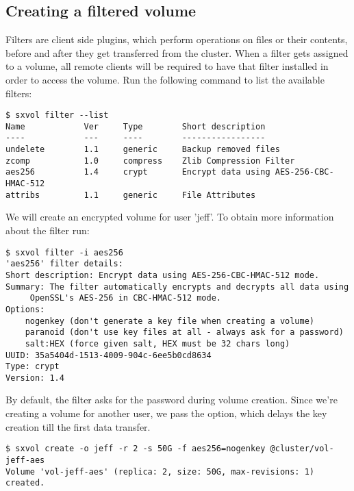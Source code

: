 \subsection{Creating a filtered volume}
Filters are client side plugins, which perform operations on files or their contents, before
and after they get transferred from the \SX cluster. When a filter gets assigned to a volume,
all remote clients will be required to have that filter installed in order to access the volume.
Run the following command to list the available filters:
\begin{lstlisting}
$ sxvol filter --list
Name            Ver     Type        Short description
----            ---     ----        -----------------
undelete        1.1     generic     Backup removed files
zcomp           1.0     compress    Zlib Compression Filter
aes256          1.4     crypt	    Encrypt data using AES-256-CBC-HMAC-512
attribs         1.1     generic     File Attributes
\end{lstlisting}
We will create an encrypted volume for user 'jeff'. To obtain more information
about the  filter run:
\begin{lstlisting}
$ sxvol filter -i aes256
'aes256' filter details:
Short description: Encrypt data using AES-256-CBC-HMAC-512 mode.
Summary: The filter automatically encrypts and decrypts all data using
	 OpenSSL's AES-256 in CBC-HMAC-512 mode.
Options: 
	nogenkey (don't generate a key file when creating a volume)
	paranoid (don't use key files at all - always ask for a password)
	salt:HEX (force given salt, HEX must be 32 chars long)
UUID: 35a5404d-1513-4009-904c-6ee5b0cd8634
Type: crypt
Version: 1.4
\end{lstlisting}
By default, the  filter asks for the password during volume
creation. Since we're creating a volume for another user, we pass the
 option, which delays the key creation till the first data
transfer.
\begin{lstlisting}
$ sxvol create -o jeff -r 2 -s 50G -f aes256=nogenkey @cluster/vol-jeff-aes
Volume 'vol-jeff-aes' (replica: 2, size: 50G, max-revisions: 1) created.
\end{lstlisting}

